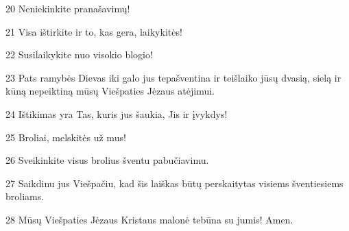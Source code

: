 \par 20 Neniekinkite pranašavimų! 
\par 21 Visa ištirkite ir to, kas gera, laikykitės! 
\par 22 Susilaikykite nuo visokio blogio! 
\par 23 Pats ramybės Dievas iki galo jus tepašventina ir teišlaiko jūsų dvasią, sielą ir kūną nepeiktiną mūsų Viešpaties Jėzaus atėjimui. 
\par 24 Ištikimas yra Tas, kuris jus šaukia, Jis ir įvykdys! 
\par 25 Broliai, melskitės už mus! 
\par 26 Sveikinkite visus brolius šventu pabučiavimu. 
\par 27 Saikdinu jus Viešpačiu, kad šis laiškas būtų perskaitytas visiems šventiesiems broliams. 
\par 28 Mūsų Viešpaties Jėzaus Kristaus malonė tebūna su jumis! Amen.



